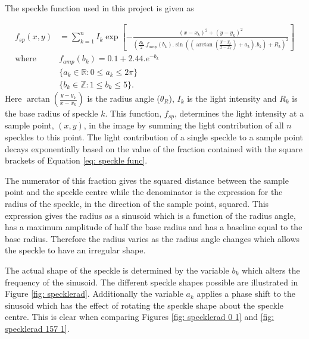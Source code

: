 \documentclass[12pt,oneside,openany,a4paper, %
english, %
masters-t, goldenblock]{usthesis}
\begin{document}
The speckle function used in this project is given as 

\begin{align}
  f_{sp}(x,y) &= \sum_{k=1}^{n} I_k \exp{ \left[ -\frac{ \left( x-x_k \right) ^2 + \left( y-y_k \right) ^2}{\left( \frac{R_{k}}{2} . f_{amp}(b_k) . \sin \left( \left( \arctan{ \left( \frac{y-y_k}{x-x_k} \right) } +a_k \right) . b_k \right) +R_k \right)^2} \right] } \label{eq: speckle func} \\
  \text{where} \quad &f_{amp}(b_k) = 0.1+2.44 . e^{-b_k} \label{eq: speckle amp func} \\
  & \{ a_k \in \mathbb{R}:0 \leq a_k \leq 2\pi \} \label{eq: ak set} \\
   \quad & \{ b_k \in \mathbb{Z}:1 \leq b_k \leq5 \}. \label{eq: bk set}
\end{align}
Here $\arctan{ \left( \frac{y-y_k}{x-x_k} \right) }$ is the radius angle ($\theta_R$), $I_k$ is the light intensity and $R_k$ is the base radius of speckle $k$. This function, $f_{sp}$, determines the light intensity at a sample point, $(x,y)$, in the image by summing the light contribution of all $n$ speckles to this point. The light contribution of a single speckle to a sample point decays exponentially based on the value of the fraction contained with the square brackets of Equation \ref{eq: speckle func}.

The numerator of this fraction gives the squared distance between the sample point and the speckle centre while the denominator is the expression for the radius of the speckle, in the direction of the sample point, squared. This expression gives the radius as a sinusoid which is a function of the radius angle, has a maximum amplitude of half the base radius and has a baseline equal to the base radius.  Therefore the radius varies as the radius angle changes which allows the speckle to have an irregular shape.

The actual shape of the speckle is determined by the variable $b_k$ which alters the frequency of the sinusoid. The different speckle shapes possible are illustrated in Figure \ref{fig: specklerad}. Additionally the variable $a_k$ applies a phase shift to the sinusoid which has the effect of rotating the speckle shape about the speckle centre. This is clear when comparing Figures \ref{fig: specklerad 0 1} and \ref{fig: specklerad 157 1}. 
\end{document}
